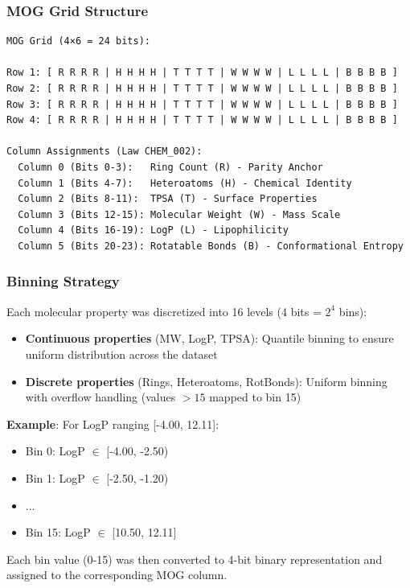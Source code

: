 \documentclass[11pt,letterpaper]{article}
\begin{document}
\subsubsection{MOG Grid Structure}

\begin{verbatim}
MOG Grid (4×6 = 24 bits):

Row 1: [ R R R R | H H H H | T T T T | W W W W | L L L L | B B B B ]
Row 2: [ R R R R | H H H H | T T T T | W W W W | L L L L | B B B B ]
Row 3: [ R R R R | H H H H | T T T T | W W W W | L L L L | B B B B ]
Row 4: [ R R R R | H H H H | T T T T | W W W W | L L L L | B B B B ]

Column Assignments (Law CHEM_002):
  Column 0 (Bits 0-3):   Ring Count (R) - Parity Anchor
  Column 1 (Bits 4-7):   Heteroatoms (H) - Chemical Identity
  Column 2 (Bits 8-11):  TPSA (T) - Surface Properties
  Column 3 (Bits 12-15): Molecular Weight (W) - Mass Scale
  Column 4 (Bits 16-19): LogP (L) - Lipophilicity
  Column 5 (Bits 20-23): Rotatable Bonds (B) - Conformational Entropy
\end{verbatim}

\subsubsection{Binning Strategy}

Each molecular property was discretized into 16 levels (4 bits = $2^4$ bins):

\begin{itemize}
    \item \textbf{Continuous properties} (MW, LogP, TPSA): Quantile binning to ensure uniform distribution across the dataset
    \item \textbf{Discrete properties} (Rings, Heteroatoms, RotBonds): Uniform binning with overflow handling (values $>15$ mapped to bin 15)
\end{itemize}

\textbf{Example}: For LogP ranging [-4.00, 12.11]:
\begin{itemize}
    \item Bin 0: LogP $\in$ [-4.00, -2.50)
    \item Bin 1: LogP $\in$ [-2.50, -1.20)
    \item ...
    \item Bin 15: LogP $\in$ [10.50, 12.11]
\end{itemize}

Each bin value (0-15) was then converted to 4-bit binary representation and assigned to the corresponding MOG column.
\end{document}
